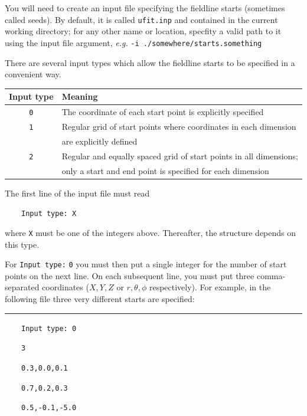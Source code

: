 \documentclass[12pt,twoside]{article}
\begin{document}
You will need to create an input file specifying the fieldline starts (sometimes called seeds). By default, it is called \texttt{ufit.inp} and contained in the current working directory; for any other name or location, specfity a valid path to it using the input file argument, \textit{e.g.} \texttt{-i ./somewhere/starts.something}

There are several input types which allow the fieldline starts to be specified in a convenient way.

\vspace{2mm}

\begin{tabular}{|c|l|}		
		\hline
		\textbf{Input type} & \textbf{Meaning} \\\hline\hline
		\texttt{0} & The coordinate of each start point is explicitly specified \\\hline
		\texttt{1} & Regular grid of start points where coordinates in each dimension  \\
		           & are explicitly defined  \\\hline
		\texttt{2} & Regular and equally spaced grid of start points in all dimensions; \\
		           & only a start and end point is specified for each dimension \\\hline
\end{tabular}

\vspace{2mm}

The first line of the input file must read 

$\quad\quad$\texttt{Input type: X}

where \texttt{X} must be one of the integers above. Thereafter, the structure depends on this type.

For \texttt{Input type:} \texttt{0} you must then put a single integer for the number of start points on the next line. On each subsequent line, you must put three comma-separated coordinates ($X,Y,Z$ or $r,\theta,\phi$ respectively). For example, in the following file three very different starts are specified:

\noindent\rule{\linewidth}{0.4pt}

$\quad\quad$\texttt{Input type: 0}

$\quad\quad$\texttt{3}

$\quad\quad$\texttt{0.3,0.0,0.1}

$\quad\quad$\texttt{0.7,0.2,0.3}

$\quad\quad$\texttt{0.5,-0.1,-5.0}
\end{document}
